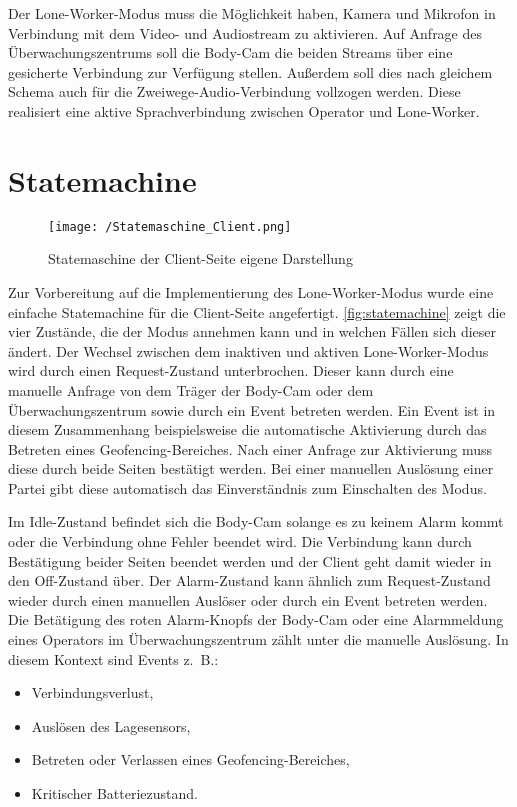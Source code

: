 \documentclass[thesis.tex]{subfiles}
\begin{document}
Der Lone-Worker-Modus muss die Möglichkeit haben, Kamera und Mikrofon in Verbindung mit dem Video- und Audiostream zu aktivieren.
Auf Anfrage des Überwachungszentrums soll die Body-Cam die beiden Streams über eine gesicherte Verbindung zur Verfügung stellen.
Außerdem soll dies nach gleichem Schema auch für die Zweiwege-Audio-Verbindung vollzogen werden.
Diese realisiert eine aktive Sprachverbindung zwischen Operator und Lone-Worker.


\section{Statemachine}\label{chap:statemachine}

\begin{figure}[h]
    \centering
    \texttt{[image: /Statemaschine\_Client.png]}
    \caption[Statemaschine der Client-Seite]{Statemaschine der Client-Seite \lbrack eigene Darstellung\rbrack}
    \label{fig:statemachine}
\end{figure}

Zur Vorbereitung auf die Implementierung des Lone-Worker-Modus wurde eine einfache Statemachine für die Client-Seite angefertigt.
\autoref{fig:statemachine} zeigt die vier Zustände, die der Modus annehmen kann und in welchen Fällen sich dieser ändert.
Der Wechsel zwischen dem inaktiven und aktiven Lone-Worker-Modus wird durch einen Request-Zustand unterbrochen.
Dieser kann durch eine manuelle Anfrage von dem Träger der Body-Cam oder dem Überwachungszentrum sowie durch ein Event betreten werden.
Ein Event ist in diesem Zusammenhang beispielsweise die automatische Aktivierung durch das Betreten eines Geofencing-Bereiches.
Nach einer Anfrage zur Aktivierung muss diese durch beide Seiten bestätigt werden.
Bei einer manuellen Auslösung einer Partei gibt diese automatisch das Einverständnis zum Einschalten des Modus.

Im Idle-Zustand befindet sich die Body-Cam solange es zu keinem Alarm kommt oder die Verbindung ohne Fehler beendet wird.
Die Verbindung kann durch Bestätigung beider Seiten beendet werden und der Client geht damit wieder in den Off-Zustand über.
Der Alarm-Zustand kann ähnlich zum Request-Zustand wieder durch einen manuellen Auslöser oder durch ein Event betreten werden.
Die Betätigung des roten Alarm-Knopfs der Body-Cam oder eine Alarmmeldung eines Operators im Überwachungszentrum zählt unter die manuelle Auslösung.
In diesem Kontext sind Events z.~B.:
\begin{itemize}
    \item Verbindungsverlust,
    \item Auslösen des Lagesensors,
    \item Betreten oder Verlassen eines Geofencing-Bereiches,
    \item Kritischer Batteriezustand.
\end{itemize}
\end{document}
